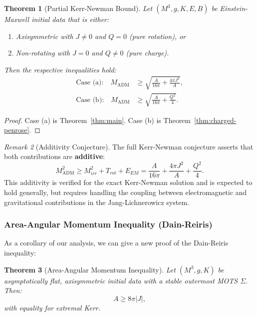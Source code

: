 \documentclass[12pt]{article}
\theoremstyle{plain}
\newtheorem{theorem}{Theorem}[section]
\theoremstyle{definition}
\theoremstyle{remark}
\newtheorem{remark}[theorem]{Remark}
\newcommand{\ADM}{\mathrm{ADM}}
\begin{document}
\begin{theorem}[Partial Kerr-Newman Bound]\label{thm:partial-KN}
Let $(M^3, g, K, E, B)$ be Einstein-Maxwell initial data that is either:
\begin{enumerate}[label=(\alph*)]
    \item Axisymmetric with $J \neq 0$ and $Q = 0$ (pure rotation), or
    \item Non-rotating with $J = 0$ and $Q \neq 0$ (pure charge).
\end{enumerate}
Then the respective inequalities hold:
\begin{align}
    \text{Case (a):} \quad M_{\ADM} &\geq \sqrt{\frac{A}{16\pi} + \frac{4\pi J^2}{A}}, \\
    \text{Case (b):} \quad M_{\ADM} &\geq \sqrt{\frac{A}{16\pi} + \frac{Q^2}{4}}.
\end{align}
\end{theorem}

\begin{proof}
Case (a) is Theorem~\ref{thm:main}. Case (b) is Theorem~\ref{thm:charged-penrose}.
\end{proof}

\begin{remark}[Additivity Conjecture]
The full Kerr-Newman conjecture asserts that both contributions are \textbf{additive}:
\[
M_{\ADM}^2 \geq M_{irr}^2 + T_{rot} + E_{EM} = \frac{A}{16\pi} + \frac{4\pi J^2}{A} + \frac{Q^2}{4}.
\]
This additivity is verified for the exact Kerr-Newman solution and is expected to hold generally, but requires handling the coupling between electromagnetic and gravitational contributions in the Jang-Lichnerowicz system.
\end{remark}

\subsubsection{Area-Angular Momentum Inequality (Dain-Reiris)}

As a corollary of our analysis, we can give a new proof of the Dain-Reiris inequality:

\begin{theorem}[Area-Angular Momentum Inequality]\label{thm:area-J}
Let $(M^3, g, K)$ be asymptotically flat, axisymmetric initial data with a stable outermost MOTS $\Sigma$. Then:
\begin{equation}
    A \geq 8\pi |J|,
\end{equation}
with equality for extremal Kerr.
\end{theorem}
\end{document}
